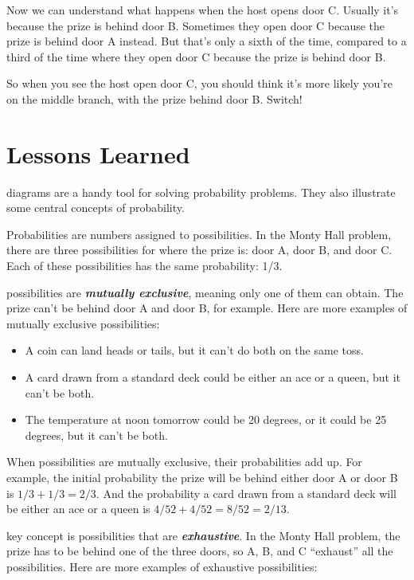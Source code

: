 \documentclass[justified]{tufte-book}
\providecommand{\tightlist}{%
  \setlength{\itemsep}{0pt}\setlength{\parskip}{0pt}}
\theoremstyle{definition}
\theoremstyle{definition}
\theoremstyle{definition}
\theoremstyle{remark}
\begin{document}
Now we can understand what happens when the host opens door C. Usually it's because the prize is behind door B. Sometimes they open door C because the prize is behind door A instead. But that's only a sixth of the time, compared to a third of the time where they open door C because the prize is behind door B.

So when you see the host open door C, you should think it's more likely you're on the middle branch, with the prize behind door B. Switch!

\hypertarget{lessons}{%
\section{Lessons Learned}\label{lessons}}

 diagrams are a handy tool for solving probability problems. They also illustrate some central concepts of probability.

Probabilities are numbers assigned to possibilities. In the Monty Hall problem, there are three possibilities for where the prize is: door A, door B, and door C. Each of these possibilities has the same probability: 1/3.

 possibilities are \textbf{\emph{mutually exclusive}}, meaning only one of them can obtain. The prize can't be behind door A and door B, for example. Here are more examples of mutually exclusive possibilities:

\begin{itemize}
\tightlist
\item
  A coin can land heads or tails, but it can't do both on the same toss.
\item
  A card drawn from a standard deck could be either an ace or a queen, but it can't be both.
\item
  The temperature at noon tomorrow could be 20 degrees, or it could be 25 degrees, but it can't be both.
\end{itemize}

When possibilities are mutually exclusive, their probabilities add up. For example, the initial probability the prize will be behind either door A or door B is \(1/3 + 1/3 = 2/3\). And the probability a card drawn from a standard deck will be either an ace or a queen is \(4/52 + 4/52 = 8/52 = 2/13\).

 key concept is possibilities that are \textbf{\emph{exhaustive}}. In the Monty Hall problem, the prize has to be behind one of the three doors, so A, B, and C ``exhaust'' all the possibilities. Here are more examples of exhaustive possibilities:
\end{document}

